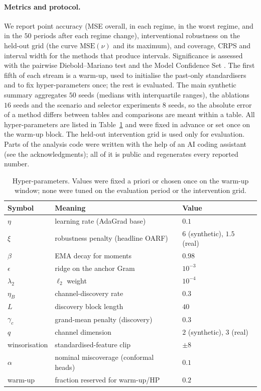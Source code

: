 \documentclass[12pt]{article}
\theoremstyle{plain}
\theoremstyle{remark}
\newcommand{\OARF}{\textsc{OARF}}
\begin{document}
\paragraph{Metrics and protocol.}
We report point accuracy (MSE overall, in each regime, in the worst regime, and in the
$50$ periods after each regime change), interventional robustness on the held-out grid
(the curve $\mathrm{MSE}(\nu)$ and its maximum), and coverage, CRPS and interval width
for the methods that produce intervals. Significance is assessed with the pairwise
Diebold--Mariano test \citep{diebold1995dm} and the Model Confidence Set
\citep{hansen2011mcs}. The first fifth of each stream is a warm-up, used to initialise
the past-only standardisers and to fix hyper-parameters once; the rest is evaluated.
The main synthetic summary aggregates $50$ seeds (medians with interquartile ranges),
the ablations $16$ seeds and the scenario and selector experiments $8$ seeds, so the
absolute error of a method differs between tables and comparisons are meant within a
table. All hyper-parameters are listed in Table~\ref{tab:hyper} and were fixed in
advance or set once on the warm-up block. The held-out intervention grid is used only
for evaluation. Parts of the analysis code were written with the help of an AI coding
assistant (see the acknowledgments); all of it is public and regenerates every
reported number.

\begin{table}[htbp]
\centering
\caption{Hyper-parameters. Values were fixed a priori or chosen once on the warm-up
window; none were tuned on the evaluation period or the intervention grid.}
\label{tab:hyper}
\small
\begin{tabular}{lll}
\toprule
Symbol & Meaning & Value\\
\midrule
$\eta$ & learning rate (AdaGrad base) & $0.1$\\
$\xi$ & robustness penalty (headline \OARF{}) & $6$ (synthetic), $1.5$ (real)\\
$\beta$ & EMA decay for moments & $0.98$\\
$\epsilon$ & ridge on the anchor Gram & $10^{-3}$\\
$\lambda_2$ & $\ell_2$ weight & $10^{-4}$\\
$\eta_B$ & channel-discovery rate & $0.3$\\
$L$ & discovery block length & $40$\\
$\gamma_c$ & grand-mean penalty (discovery) & $0.3$\\
$q$ & channel dimension & $2$ (synthetic), $3$ (real)\\
winsorisation & standardised-feature clip & $\pm 8$\\
$\alpha$ & nominal miscoverage (conformal heads) & $0.1$\\
warm-up & fraction reserved for warm-up/HP & $0.2$\\
\bottomrule
\end{tabular}
\end{table}
\end{document}
